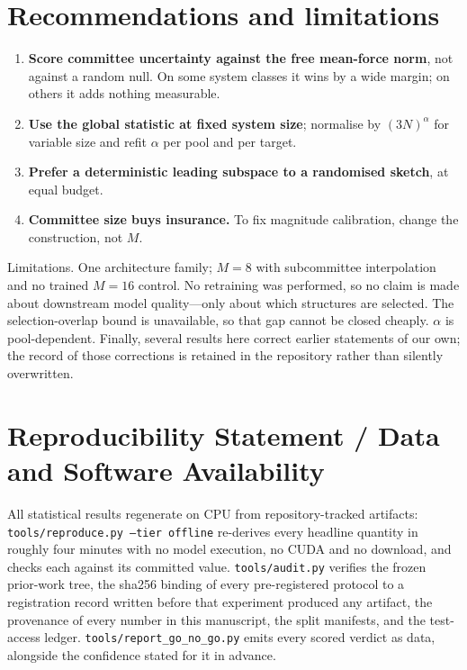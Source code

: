 \section{Recommendations and limitations}

\begin{enumerate}
\item \textbf{Score committee uncertainty against the free mean-force norm}, not
against a random null. On some system classes it wins by a wide margin; on others
it adds nothing measurable.
\item \textbf{Use the global statistic at fixed system size}; normalise by
$(3N)^{\alpha}$ for variable size and refit $\alpha$ per pool and per target.
\item \textbf{Prefer a deterministic leading subspace to a randomised sketch}, at
equal budget.
\item \textbf{Committee size buys insurance.} To fix magnitude calibration,
change the construction, not $M$.
\end{enumerate}

Limitations. One architecture family; $M=8$ with subcommittee interpolation and
no trained $M=16$ control. No retraining was performed, so no claim is made about
downstream model quality---only about which structures are selected. The
selection-overlap bound is unavailable, so that gap cannot be closed cheaply.
$\alpha$ is pool-dependent. Finally, several results here correct earlier
statements of our own; the record of those corrections is retained in the
repository rather than silently overwritten.

\section*{Reproducibility Statement / Data and Software Availability}
\label{sec:avail}
All statistical results regenerate on CPU from repository-tracked artifacts:
\texttt{tools/reproduce.py --tier offline} re-derives every headline quantity in
roughly four minutes with no model execution, no CUDA and no download, and checks
each against its committed value. \texttt{tools/audit.py} verifies the frozen
prior-work tree, the sha256 binding of every pre-registered protocol to a
registration record written before that experiment produced any artifact, the
provenance of every number in this manuscript, the split manifests, and the
test-access ledger. \texttt{tools/report\_go\_no\_go.py} emits every scored
verdict as data, alongside the confidence stated for it in advance.

